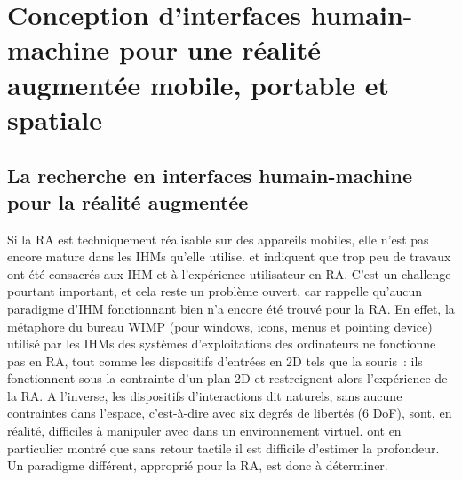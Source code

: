 \section*{Conception d'interfaces humain-machine pour une réalité augmentée mobile, portable et spatiale}
\subsection*{La recherche en interfaces humain-machine pour la réalité augmentée}
Si la RA est techniquement réalisable sur des appareils mobiles, elle n'est pas encore mature dans les IHMs qu'elle utilise. \citet{ZhouDuhBillinghurst2008} et \citet{DeSaChurchill2013} indiquent que trop peu de travaux ont été consacrés aux IHM et à l'expérience utilisateur en RA. C'est un challenge pourtant important, et cela reste un problème ouvert, car \citet{VanKrevelenPoelman2010} rappelle qu'aucun paradigme d'IHM fonctionnant bien n'a encore été trouvé pour la RA. En effet, la métaphore du bureau WIMP (pour \foreignlanguage{english}{windows}, \foreignlanguage{english}{icons}, \foreignlanguage{english}{menus} et \foreignlanguage{english}{pointing device}) utilisé par les IHMs des systèmes d'exploitations des ordinateurs ne fonctionne pas en RA, tout comme les dispositifs d'entrées en 2D tels que la souris~: ils fonctionnent sous la contrainte d'un plan 2D et restreignent alors l'expérience de la RA. \citep{VanKrevelenPoelman2010} A l'inverse, les dispositifs d'interactions dit naturels, sans aucune contraintes dans l'espace, c'est-à-dire avec six degrés de libertés (6 DoF), sont, en réalité, difficiles à manipuler avec dans un environnement virtuel. \citet{ChanKaoChenEtAl2010} ont en particulier montré que sans retour tactile il est difficile d'estimer la profondeur. Un paradigme différent, approprié pour la RA, est donc à déterminer.

